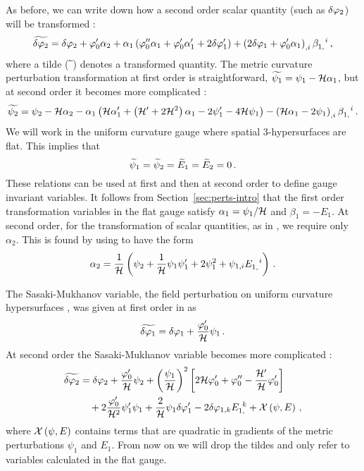 As before, we
can write down how a second order scalar quantity (such as $\delta\varphi_{2}$) will be
transformed \cite{Malik:2005cy}:
% 
\begin{equation}
\label{eq:dvp2transform-perts}
 \widetilde{\delta\varphi_{2}} = \delta\varphi_{2} + \varphi_0'\alpha_2 + \alpha_1\left(\varphi_0'' \alpha_1 + \varphi_0'
\alpha_1' + 2\delta\varphi_{1}'\right) + \left(2\delta\varphi_{1} + \varphi_0'\alpha_1\right)_{,i}
\beta_{1,}^{~~i} \,,
\end{equation}
% 
where a tilde ($\widetilde{~}$) denotes a transformed quantity. 
The metric curvature perturbation transformation at first order is straightforward,
$\widetilde{\psi_1} = \psi_1 -\mathcal{H} \alpha_1$, but at second order it becomes more complicated
\cite{Malik:2005cy}:
% 
\begin{equation}
 \label{eq:psi2transform-perts}
\widetilde{\psi_2} = \psi_2 -\mathcal{H}\alpha_2 -\alpha_1\left(\mathcal{H}\alpha_1' + 
              \left(\mathcal{H}' +2\mathcal{H}^2\right)\alpha_1 -2\psi_1' -4\mathcal{H}\psi_1\right)
              -\left(\mathcal{H}\alpha_1 -2\psi_1\right)_{,i} \beta_{1,}^{~~i}\,.
\end{equation}
% 
We will work in the uniform curvature gauge where spatial 3-hypersurfaces are flat.
This implies that
%  
\begin{equation}
 \label{eq:gauge-num}
\widetilde\psi_1=\widetilde\psi_2=\widetilde E_1=\widetilde E_2=0 \,.
\end{equation}
% 
These relations can be used at first and then at second order to define gauge
invariant variables. It follows from Section~\ref{sec:perts-intro} that the first
order
transformation variables in the flat gauge satisfy $\alpha_1 = \psi_1/\mathcal{H}$ and
$\beta_1
= -E_1$. At second order, for the transformation of scalar quantities, as in
, we require only $\alpha_2$. This is found by using
 to have the form
% 
\begin{equation}
 \label{eq:alpha2-perts}
\alpha_2 = \frac{1}{\mathcal{H}}\left( \psi_2 + \frac{1}{\mathcal{H}}\psi_1 \psi_1' + 2\psi_1^2 
             + \psi_{1,i} E_{1,}^{~~i} \right) \,.
\end{equation}
% 

The Sasaki-Mukhanov variable, \iec the field perturbation on uniform curvature
hypersurfaces \cite{Sasaki:1986hm,Mukhanov:1988jd}, was given at first order in
 as
%  
\begin{equation}
\label{eq:Q1I-num}
\widetilde{\delta\varphi_{1}}=\delta\varphi_{1}+\frac{\varphi_{0}'}{\mathcal{H}}\psi_1\,.
\end{equation}
% 
% 
At second order the Sasaki-Mukhanov variable becomes more complicated
\cite{Malik:2005cy,Malik:2003mv}:
% 
\begin{align}
\label{eq:Q2I-num}
\widetilde{\delta\varphi_{2}} &= \delta\varphi_{2}+\frac{\varphi_{0}'}{\mathcal{H}}\psi_2
+\left(\frac{\psi_1}{\mathcal{H}}\right)^2\left[
2\mathcal{H}\varphi_{0}'+\varphi_{0}''-\frac{\mathcal{H}'}{\mathcal{H}}\varphi_{0}'\right] \nonumber\\
& \quad +2\frac{\varphi_{0}'}{\mathcal{H}^2}\psi_1'\psi_1+\frac{2}{\mathcal{H}}\psi_1\delta\varphi_{1}'
-2\delta\varphi_{1,k}E_{1,}^{~k}
+{\cal{X}}\left(\psi,E\right)\,,
\end{align}
% 
where ${\cal{X}}\left(\psi,E\right)$ contains terms that are quadratic in
gradients of the metric perturbations $\psi_1$ and $E_1$. From now on we will
drop the tildes and only refer to variables calculated in the flat gauge.


